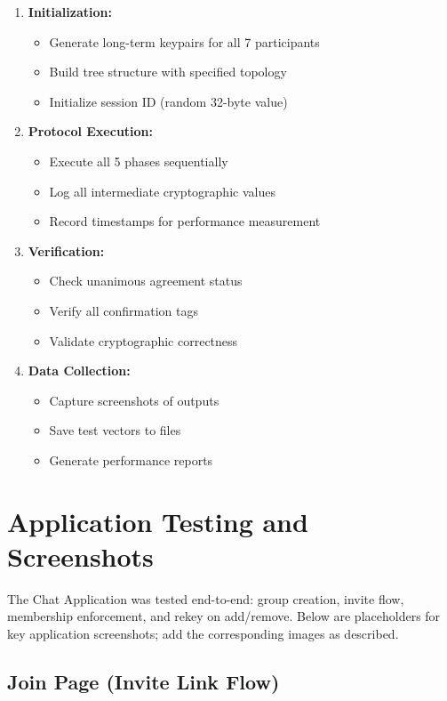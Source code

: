 \documentclass[12pt,a4paper]{report}
\begin{document}
\begin{enumerate}
\item \textbf{Initialization:}
\begin{itemize}
\item Generate long-term keypairs for all 7 participants
\item Build tree structure with specified topology
\item Initialize session ID (random 32-byte value)
\end{itemize}

\item \textbf{Protocol Execution:}
\begin{itemize}
\item Execute all 5 phases sequentially
\item Log all intermediate cryptographic values
\item Record timestamps for performance measurement
\end{itemize}

\item \textbf{Verification:}
\begin{itemize}
\item Check unanimous agreement status
\item Verify all confirmation tags
\item Validate cryptographic correctness
\end{itemize}

\item \textbf{Data Collection:}
\begin{itemize}
\item Capture screenshots of outputs
\item Save test vectors to files
\item Generate performance reports
\end{itemize}
\end{enumerate}

\section{Application Testing and Screenshots}

The Chat Application was tested end-to-end: group creation, invite flow, membership enforcement, and rekey on add/remove. Below are placeholders for key application screenshots; add the corresponding images as described.

\subsection{Join Page (Invite Link Flow)}
\end{document}
